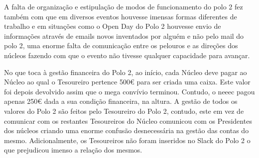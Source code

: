 A falta de organização e estipulação de modos de funcionamento do polo 2 fez também com que em diversos eventos houvesse imensas formas diferentes de trabalho e em situações como o Open Day do Polo 2 houvesse envio de informações através de emails novos inventados por alguém e não pelo mail do polo 2, uma enorme falta de comunicação entre os pelouros e as direções dos núcleos fazendo com que o evento não tivesse qualquer capacidade para avançar.

No que toca à gestão financeira do Polo 2, ao início, cada Núcleo deve pagar ao Núcleo ao qual o Tesoureiro pertence 500€ para ser criada uma caixa. Este valor foi depois devolvido assim que o mega convívio terminou. Contudo, o \acrshort{neeec} pagou apenas 250€ dada a sua condição financeira, na altura. A gestão de todos os valores do Polo 2 são feitos pelo Tesoureiro do Polo 2, contudo, este em vez de comunicar com os restantes Tesoureiros do Núcleo comunicou com os Presidentes dos núcleos criando uma enorme confusão desnecessária na gestão das contas do mesmo. Adicionalmente, os Tesoureiros não foram inseridos no Slack do Polo 2 o que prejudicou imenso a relação dos mesmos.

